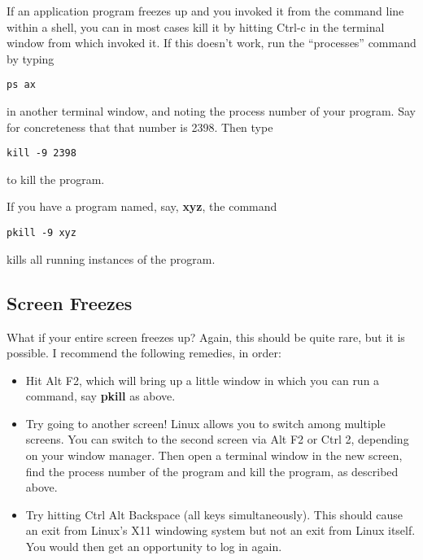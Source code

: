 \documentclass[11pt]{article}
\begin{document}
If an application program freezes up and you invoked it from the command
line within a shell, you can in most cases kill it by hitting Ctrl-c in
the terminal window from which invoked it.  If this doesn't work, run
the ``processes'' command by typing

\begin{Verbatim}[fontsize=\relsize{-2}]
ps ax
\end{Verbatim}

in another terminal window, and noting the process number of your
program.  Say for concreteness that that number is 2398.  Then type

\begin{Verbatim}[fontsize=\relsize{-2}]
kill -9 2398
\end{Verbatim}

to kill the program.

If you have a program named, say, {\bf xyz}, the command

\begin{Verbatim}[fontsize=\relsize{-2}]
pkill -9 xyz
\end{Verbatim}

kills all running instances of the program.

\subsection{Screen Freezes}
What if your entire screen freezes up?  Again, this should be quite
rare, but it is possible.  I recommend the following remedies, in order:

\begin{itemize}

\item Hit Alt F2, which will bring up a little window in which you can
run a command, say {\bf pkill} as above.  

\item Try going to another screen!  Linux allows you to switch among
multiple screens.  You can switch to the second screen via Alt F2 or
Ctrl 2, depending on your window manager.  Then open a terminal window in the
new screen, find the process number of the program and kill the program,
as described above.

\item Try hitting Ctrl Alt Backspace (all keys simultaneously).  This
should cause an exit from Linux's X11 windowing system but not an exit
from Linux itself.  You would then get an opportunity to log in again.

\end{itemize}
\end{document}
